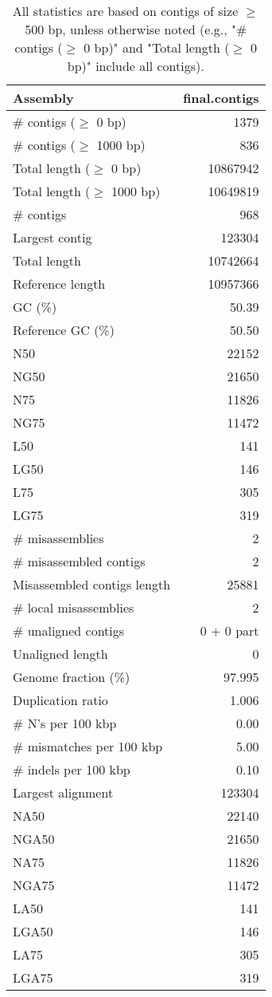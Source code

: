 \documentclass[12pt,a4paper]{article}
\begin{document}
\begin{table}[ht]
\begin{center}
\caption{All statistics are based on contigs of size $\geq$ 500 bp, unless otherwise noted (e.g., "\# contigs ($\geq$ 0 bp)" and "Total length ($\geq$ 0 bp)" include all contigs).}
\begin{tabular}{|l*{1}{|r}|}
\hline
Assembly & final.contigs \\ \hline
\# contigs ($\geq$ 0 bp) & 1379 \\ \hline
\# contigs ($\geq$ 1000 bp) & 836 \\ \hline
Total length ($\geq$ 0 bp) & 10867942 \\ \hline
Total length ($\geq$ 1000 bp) & 10649819 \\ \hline
\# contigs & 968 \\ \hline
Largest contig & 123304 \\ \hline
Total length & 10742664 \\ \hline
Reference length & 10957366 \\ \hline
GC (\%) & 50.39 \\ \hline
Reference GC (\%) & 50.50 \\ \hline
N50 & 22152 \\ \hline
NG50 & 21650 \\ \hline
N75 & 11826 \\ \hline
NG75 & 11472 \\ \hline
L50 & 141 \\ \hline
LG50 & 146 \\ \hline
L75 & 305 \\ \hline
LG75 & 319 \\ \hline
\# misassemblies & 2 \\ \hline
\# misassembled contigs & 2 \\ \hline
Misassembled contigs length & 25881 \\ \hline
\# local misassemblies & 2 \\ \hline
\# unaligned contigs & 0 + 0 part \\ \hline
Unaligned length & 0 \\ \hline
Genome fraction (\%) & 97.995 \\ \hline
Duplication ratio & 1.006 \\ \hline
\# N's per 100 kbp & 0.00 \\ \hline
\# mismatches per 100 kbp & 5.00 \\ \hline
\# indels per 100 kbp & 0.10 \\ \hline
Largest alignment & 123304 \\ \hline
NA50 & 22140 \\ \hline
NGA50 & 21650 \\ \hline
NA75 & 11826 \\ \hline
NGA75 & 11472 \\ \hline
LA50 & 141 \\ \hline
LGA50 & 146 \\ \hline
LA75 & 305 \\ \hline
LGA75 & 319 \\ \hline
\end{tabular}
\end{center}
\end{table}
\end{document}
